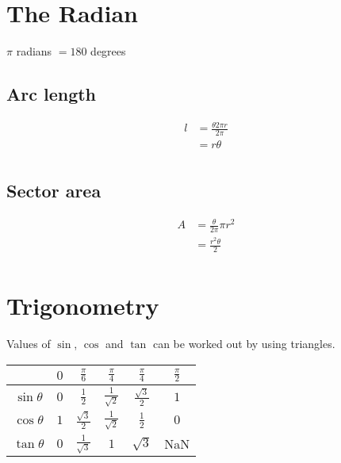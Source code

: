 \documentclass[class=article, crop=false]{standalone}
\begin{document}
\section*{The Radian}
$\pi$ radians $= 180$ degrees \\ 
\subsection*{Arc length}
\begin{align*}
l & = \frac{\theta 2 \pi r}{2 \pi} \\
& = r \theta \\
\end{align*}
\subsection*{Sector area} 
\begin{align*}
A & = \frac{\theta}{2 \pi} \pi r^2 \\
& = \frac{r^2 \theta}{2} \\
\end{align*}
\section*{Trigonometry}
Values of $\sin$, $\cos$ and $\tan$ can be worked out by using triangles.

\begin{center}
\begin{tabular}{ c | c c c c c }
\hline
	 & $0$ & $\frac{\pi}{6}$ & $\frac{\pi}{4}$ & $\frac{\pi}{4}$ & $\frac{\pi}{2}$ \\ 
\hline
	$\sin \theta$ & $0$ & $\frac{1}{2}$ & $\frac{1}{\sqrt{2}}$ & $\frac{\sqrt{3}}{2}$ & $1$ \\ 
	$\cos \theta$ & $1$ & $\frac{\sqrt{3}}{2}$ & $\frac{1}{\sqrt{2}}$ & $\frac{1}{2}$ & $0$ \\ 
	$\tan \theta$ & $0$ & $\frac{1}{\sqrt{3}}$ & $1$ & $\sqrt{3}$ & NaN \\ 
\hline
\end{tabular}
\end{center}
\end{document}
